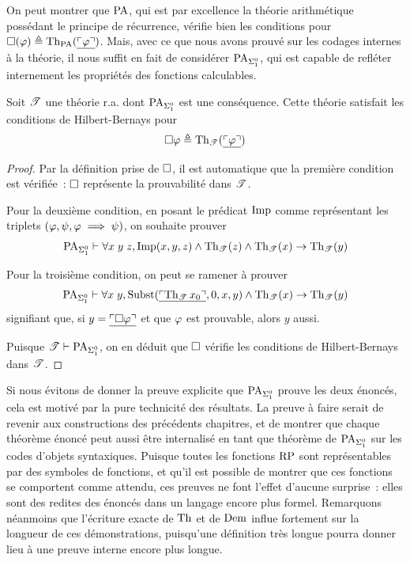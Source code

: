 On peut montrer que $\operatorname{PA}$, qui est par excellence la théorie
arithmétique possédant le principe de récurrence, vérifie bien les conditions
pour $\mathbin{\square}(\varphi) \triangleq \operatorname{Th}_{\operatorname{PA}}(\underline{\ulcorner\varphi\urcorner})$. Mais,
avec ce que nous avons prouvé sur les codages internes à la théorie, il nous
suffit en fait de considérer $\operatorname{PA}_{\Sigma^0_{1}}$, qui est capable de refléter
internement les propriétés des fonctions calculables.

\begin{proposition}\label{prop.HB.PA}
  Soit $\mathscr T$ une théorie r.a. dont $\operatorname{PA}_{\Sigma^0_{1}}$ est une conséquence.
  Cette théorie satisfait les conditions de Hilbert-Bernays pour
  \[\mathbin{\square} \varphi \triangleq \operatorname{Th}_{\mathscr T}(\underline{\ulcorner\varphi\urcorner})\]
\end{proposition}

\begin{proof}
  Par la définition prise de $\mathbin{\square}$, il est automatique que la première
  condition est vérifiée~: $\mathbin{\square}$ représente la prouvabilité dans
  $\mathscr T$.

  Pour la deuxième condition, en posant le prédicat $\operatorname{Imp}$ comme
  représentant les triplets $(\varphi,\psi,\varphi \implies \psi)$, on
  souhaite prouver
  \[\operatorname{PA}_{\Sigma^0_{1}}\vdash \forall x\;y\;z, \operatorname{Imp}(x,y,z) \land
  \operatorname{Th}_{\mathscr T}(z) \land \operatorname{Th}_{\mathscr T}(x) \to \operatorname{Th}_{\mathscr T}(y)\]

  Pour la troisième condition, on peut se ramener à prouver
  \[\operatorname{PA}_{\Sigma^0_{1}}\vdash \forall x\;y,
  \operatorname{Subst}(\underline{\ulcorner\operatorname{Th}_{\mathscr T} x_0\urcorner},0,x,y) \land
  \operatorname{Th}_{\mathscr T}(x) \to \operatorname{Th}_{\mathscr T}(y)\]
  signifiant que, si $y = \underline{\ulcorner\mathbin{\square} \varphi\urcorner}$ et que
  $\varphi$ est prouvable, alors $y$ aussi.

  Puisque $\mathscr T \vdash \operatorname{PA}_{\Sigma^0_{1}}$, on en déduit que $\mathbin{\square}$ vérifie
  les conditions de Hilbert-Bernays dans $\mathscr T$.
\end{proof}

Si nous évitons de donner la preuve explicite que $\operatorname{PA}_{\Sigma^0_{1}}$ prouve les
deux énoncés, cela est motivé par la pure technicité des résultats. La preuve
à faire serait de revenir aux constructions des précédents chapitres, et de
montrer que chaque théorème énoncé peut aussi être internalisé en tant que
théorème de $\operatorname{PA}_{\Sigma^0_{1}}$ sur les codes d'objets syntaxiques. Puisque toutes
les fonctions $\operatorname{RP}$ sont représentables par des symboles de fonctions, et
qu'il est possible de montrer que ces fonctions se comportent comme attendu, ces
preuves ne font l'effet d'aucune surprise~: elles sont des redites des énoncés
dans un langage encore plus formel. Remarquons néanmoins que l'écriture exacte
de $\operatorname{Th}$ et de $\operatorname{Dem}$ influe fortement sur la longueur de ces démonstrations,
puisqu'une définition très longue pourra donner lieu à une preuve interne encore
plus longue.

